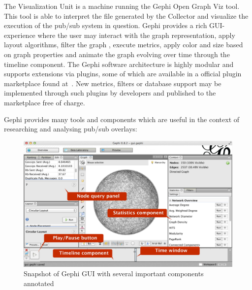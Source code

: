 The Visualization Unit is a machine running the Gephi Open Graph Viz
tool. This tool is able to interpret the \gexf file generated by the
Collector and visualize the execution of the pub/sub system in question.
Gephi provides a rich GUI-experience where the user may interact with
the graph representation, apply layout algorithms, filter the graph
, execute metrics, apply color and size based on graph
properties and animate the graph evolving over time through the timeline
component. The Gephi software architecture is highly modular and
supports extensions via plugins, some of which are available in a
official plugin marketplace found at~\cite{gephimarketplace}. New
metrics, filters or database support may be implemented through such
plugins by developers and published to the marketplace free of charge.

Gephi provides many tools and components which are useful in the context
of researching and analysing pub/sub overlays:

\begin{figure}[h]
    \centering
    \includegraphics[width=\textwidth]{figures/gui_ann}
    \caption{Snapshot of Gephi GUI with several important components
        annotated}
\end{figure}

